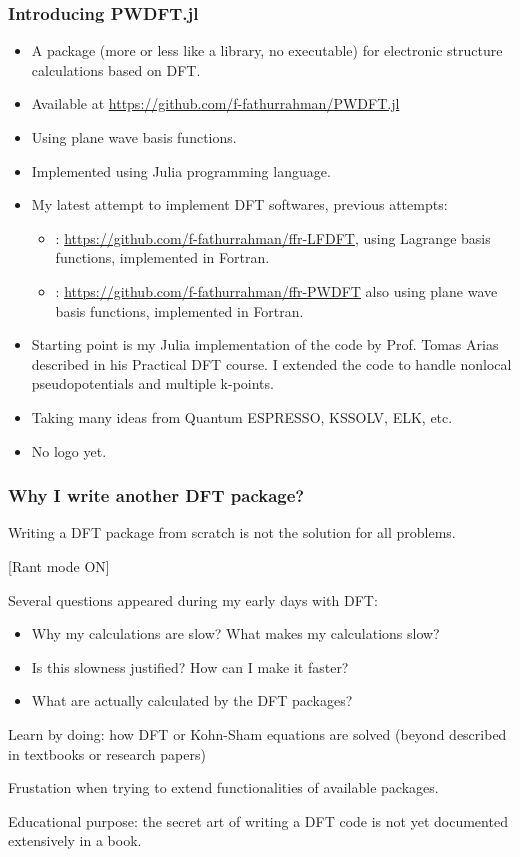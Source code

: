 \begin{frame}
\frametitle{Introducing PWDFT.jl}

\begin{itemize}
\item A package (more or less like a library, no executable) for electronic structure calculations
based on DFT.
\item Available at {\scriptsize\url{https://github.com/f-fathurrahman/PWDFT.jl}}
\item Using plane wave basis functions.
\item Implemented using Julia programming language.
\item My latest attempt to implement DFT softwares, previous attempts:
\begin{itemize}
  \item {}: {\scriptsize\url{https://github.com/f-fathurrahman/ffr-LFDFT}},
  using Lagrange basis functions, implemented in Fortran.
  \item {}: {\scriptsize\url{https://github.com/f-fathurrahman/ffr-PWDFT}}
  also using plane wave basis functions, implemented in Fortran.
\end{itemize}
\item Starting point is my Julia implementation of the code by Prof. Tomas Arias described in
his Practical DFT course. I extended the code to handle nonlocal pseudopotentials and
multiple k-points.
\item Taking many ideas from Quantum ESPRESSO, KSSOLV, ELK, etc.
\item No logo yet.
\end{itemize}

\end{frame}


\begin{frame}
\frametitle{Why I write another DFT package?}

Writing a DFT package from scratch is not the solution for all
problems.

[Rant mode ON]

Several questions appeared during my early days with DFT:
\begin{itemize}
\item Why my calculations are slow? What makes my calculations slow?
\item Is this slowness justified? How can I make it faster?
\item What are actually calculated by the DFT packages?
\end{itemize}

Learn by doing: how DFT or Kohn-Sham equations are solved (beyond
described in textbooks or research papers)

Frustation when trying to extend functionalities of available packages.

Educational purpose: the secret art of writing a DFT code is not yet documented
extensively in a book.

\end{frame}
